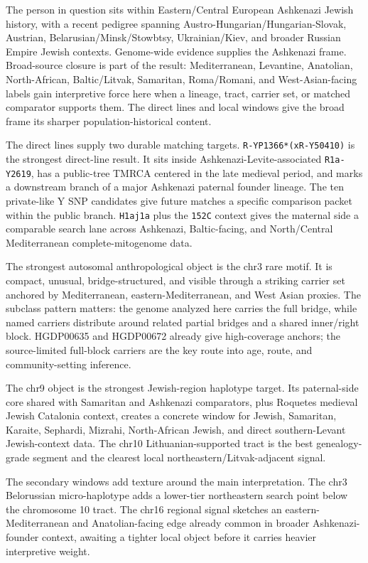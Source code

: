 \documentclass[11pt]{article}
\begin{document}
The person in question sits within Eastern/Central European Ashkenazi Jewish history, with a recent pedigree spanning Austro-Hungarian/Hungarian-Slovak, Austrian, Belarusian/Minsk/Stowbtsy, Ukrainian/Kiev, and broader Russian Empire Jewish contexts. Genome-wide evidence supplies the Ashkenazi frame. Broad-source closure is part of the result: Mediterranean, Levantine, Anatolian, North-African, Baltic/Litvak, Samaritan, Roma/Romani, and West-Asian-facing labels gain interpretive force here when a lineage, tract, carrier set, or matched comparator supports them. The direct lines and local windows give the broad frame its sharper population-historical content.

The direct lines supply two durable matching targets. \texttt{R-YP1366*(xR-Y50410)} is the strongest direct-line result. It sits inside Ashkenazi-Levite-associated \texttt{R1a-Y2619}, has a public-tree TMRCA centered in the late medieval period, and marks a downstream branch of a major Ashkenazi paternal founder lineage. The ten private-like Y SNP candidates give future matches a specific comparison packet within the public branch. \texttt{H1aj1a} plus the \texttt{152C} context gives the maternal side a comparable search lane across Ashkenazi, Baltic-facing, and North/Central Mediterranean complete-mitogenome data.

The strongest autosomal anthropological object is the chr3 rare motif. It is compact, unusual, bridge-structured, and visible through a striking carrier set anchored by Mediterranean, eastern-Mediterranean, and West Asian proxies. The subclass pattern matters: the genome analyzed here carries the full bridge, while named carriers distribute around related partial bridges and a shared inner/right block. HGDP00635 and HGDP00672 already give high-coverage anchors; the source-limited full-block carriers are the key route into age, route, and community-setting inference.

The chr9 object is the strongest Jewish-region haplotype target. Its paternal-side core shared with Samaritan and Ashkenazi comparators, plus Roquetes medieval Jewish Catalonia context, creates a concrete window for Jewish, Samaritan, Karaite, Sephardi, Mizrahi, North-African Jewish, and direct southern-Levant Jewish-context data. The chr10 Lithuanian-supported tract is the best genealogy-grade segment and the clearest local northeastern/Litvak-adjacent signal.

The secondary windows add texture around the main interpretation. The chr3 Belorussian micro-haplotype adds a lower-tier northeastern search point below the chromosome 10 tract. The chr16 regional signal sketches an eastern-Mediterranean and Anatolian-facing edge already common in broader Ashkenazi-founder context, awaiting a tighter local object before it carries heavier interpretive weight.
\end{document}
